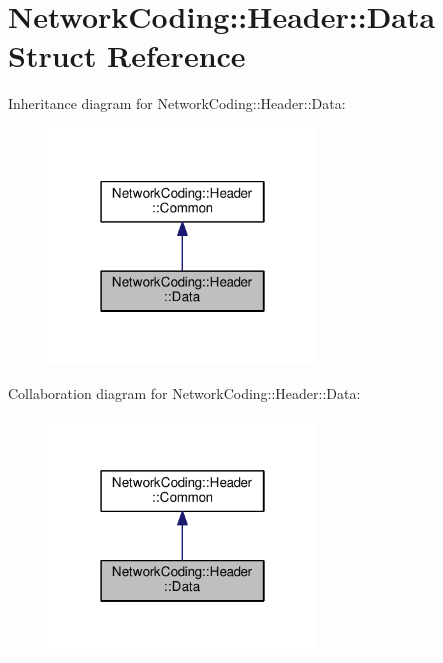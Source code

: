 \hypertarget{struct_network_coding_1_1_header_1_1_data}{}\section{Network\+Coding\+:\+:Header\+:\+:Data Struct Reference}
\label{struct_network_coding_1_1_header_1_1_data}


Inheritance diagram for Network\+Coding\+:\+:Header\+:\+:Data\+:\nopagebreak
\begin{figure}[H]
\begin{center}
\leavevmode
\includegraphics[width=202pt]{struct_network_coding_1_1_header_1_1_data__inherit__graph}
\end{center}
\end{figure}


Collaboration diagram for Network\+Coding\+:\+:Header\+:\+:Data\+:\nopagebreak
\begin{figure}[H]
\begin{center}
\leavevmode
\includegraphics[width=202pt]{struct_network_coding_1_1_header_1_1_data__coll__graph}
\end{center}
\end{figure}
